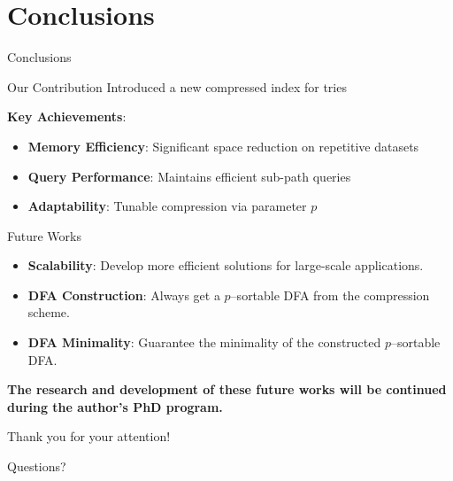 \documentclass[aspectratio=169]{beamer}
\begin{document}
\section{Conclusions}
\begin{frame}{Conclusions}
	\begin{block}{Our Contribution}
		Introduced a new compressed index for tries
	\end{block}
	\vspace{0.3cm}
	\textcolor{oiBlue}{\textbf{Key Achievements}:}
	\begin{itemize}
		\item \textbf{Memory Efficiency}: Significant space reduction on repetitive datasets
		\item \textbf{Query Performance}: Maintains efficient sub-path queries
		\item \textbf{Adaptability}: Tunable compression via parameter $p$
	\end{itemize}
\end{frame}

\begin{frame}{Future Works}
	\begin{itemize}
		\item<1-> \textcolor{oiRed}{\textbf{Scalability}:} Develop more efficient solutions for large-scale applications.
		\item<2-> \textcolor{oiBlue}{\textbf{DFA Construction}:} Always get a $p$--sortable DFA from the compression scheme.
		\item<3-> \textcolor{oiOrange}{\textbf{DFA Minimality}:} Guarantee the minimality of the constructed $p$--sortable DFA.
	\end{itemize}

	\vspace{1cm}
	\textbf{The research and development of these future works will be continued during the author's PhD program.}
\end{frame}

\begin{frame}
	\centering
	\Huge
	Thank you for your attention!

	\vspace{1cm}
	\Large
	Questions?
\end{frame}
\end{document}
